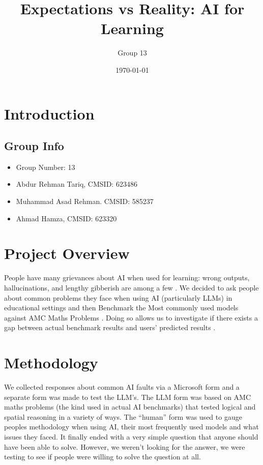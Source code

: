 \documentclass{article}
\title{\textbf{Expectations vs Reality: AI for Learning}}
\author{Group 13}
\date{\today}
\begin{document}
\maketitle

\section{Introduction}
\subsection{Group Info}

\begin{itemize}
    \item Group Number: 13
    \item Abdur Rehman Tariq, CMSID: 623486
    \item Muhammad Asad Rehman. CMSID: 585237
    \item Ahmad Hamza, CMSID: 623320
\end{itemize}




\section{Project Overview}
People have many grievances about AI when used for learning: wrong outputs, hallucinations, and lengthy gibberish are among a few \cite{gokcearslan2024chatbots}. We decided to ask people about common problems they face when using AI (particularly LLMs) in educational settings \cite{chen2020ai} and then Benchmark the Most commonly used models against AMC Maths Problems \cite{berkeley2025math}. Doing so allows us to investigate if there exists a gap between actual benchmark results and users' predicted results \cite{katsantonis2024students}. 

\section{Methodology}
We collected responses about common AI faults via a Microsoft form and a separate form was made to test the LLM’s. The LLM form was based on AMC maths problems (the kind used in actual AI benchmarks) that tested logical and spatial reasoning in a variety of ways. The “human” form was used to gauge peoples  methodology when using AI, their most frequently used models and what issues they faced. It finally ended with a very simple question that anyone should have been able to solve. However, we weren't looking for the answer, we were testing to see if people were willing to solve the question at all.
\end{document}
